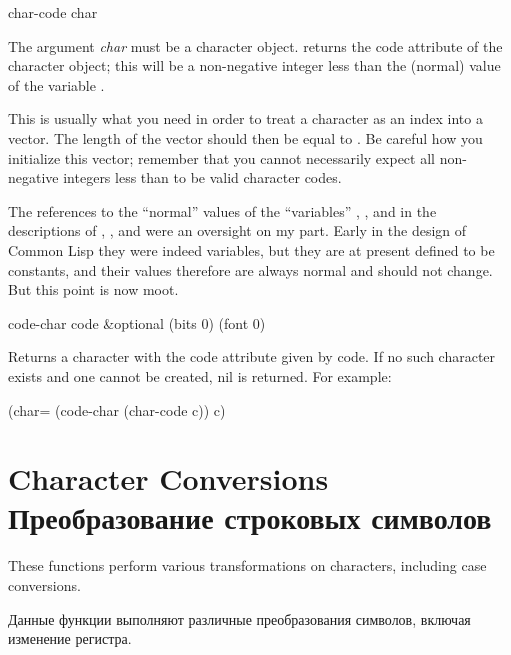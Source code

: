 \begin{defun}[Function]
char-code char

The argument \emph{char} must be a character object.
 returns the code attribute of the character object;
this will be a non-negative integer less than the (normal) value of
the variable .

\begin{new}
This is usually what you need in order to treat a character as an
index into a vector.  The length of the vector should then be
equal to .  Be careful how you initialize this
vector; remember that you cannot necessarily
expect all non-negative integers less than
 to be valid character codes.
\end{new}
\end{defun}

\medskip
\begin{new}
The references to the ``normal'' values of the ``variables''
,
, and  in the descriptions
of , , and  were an oversight on
my part.  Early in the design of Common Lisp they were indeed variables,
but they are at present defined to be constants, and their values therefore
are always normal and should not change.  But this point is now moot.
\end{new}

\begin{defun}[Function]
code-char code &optional (bits 0) (font 0)

Returns a character with the code attribute given by code. If no such character
exists and one cannot be created, nil is returned.
For example:

\begin{lisp}
(char= (code-char (char-code c)) c)
\end{lisp}
\end{defun}

\section{Character Conversions Преобразование строковых символов}

These functions perform various transformations on characters,
including case conversions.

Данные функции выполняют различные преобразования символов, включая изменение
регистра.

